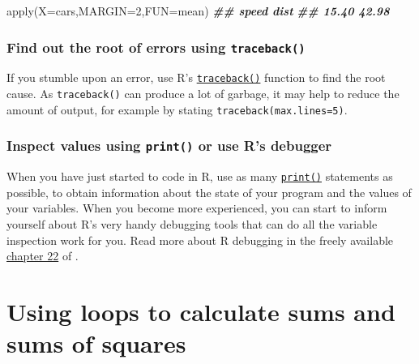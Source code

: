 \documentclass[
]{book}
\newenvironment{Shaded}{\begin{snugshade}}{\end{snugshade}}
\newcommand{\AttributeTok}[1]{\textcolor[rgb]{0.77,0.63,0.00}{#1}}
\newcommand{\DecValTok}[1]{\textcolor[rgb]{0.00,0.00,0.81}{#1}}
\newcommand{\DocumentationTok}[1]{\textcolor[rgb]{0.56,0.35,0.01}{\textbf{\textit{#1}}}}
\newcommand{\FunctionTok}[1]{\textcolor[rgb]{0.00,0.00,0.00}{#1}}
\newcommand{\NormalTok}[1]{#1}
\begin{document}
\begin{Shaded}
\begin{Highlighting}[]
\FunctionTok{apply}\NormalTok{(}\AttributeTok{X=}\NormalTok{cars,}\AttributeTok{MARGIN=}\DecValTok{2}\NormalTok{,}\AttributeTok{FUN=}\NormalTok{mean)}
\DocumentationTok{\#\# speed  dist }
\DocumentationTok{\#\# 15.40 42.98}
\end{Highlighting}
\end{Shaded}

\hypertarget{find-out-the-root-of-errors-using-traceback}{%
\subsection{\texorpdfstring{Find out the root of errors using \texttt{traceback()}}{Find out the root of errors using traceback()}}\label{find-out-the-root-of-errors-using-traceback}}

If you stumble upon an error, use R's \href{https://stat.ethz.ch/R-manual/R-devel/library/base/html/traceback.html}{\texttt{traceback()}} function to find the root cause. As \texttt{traceback()} can produce a lot of garbage, it may help to reduce the amount of output, for example by stating \texttt{traceback(max.lines=5)}.

\hypertarget{inspect-values-using-print-or-use-rs-debugger}{%
\subsection{\texorpdfstring{Inspect values using \texttt{print()} or use R's debugger}{Inspect values using print() or use R's debugger}}\label{inspect-values-using-print-or-use-rs-debugger}}

When you have just started to code in R, use as many \href{https://stat.ethz.ch/R-manual/R-patched/library/base/html/print.html}{\texttt{print()}} statements as possible, to obtain information about the state of your program and the values of your variables. When you become more experienced, you can start to inform yourself about R's very handy debugging tools that can do all the variable inspection work for you. Read more about R debugging in the freely available \href{https://adv-r.hadley.nz/debugging.html}{chapter 22} of \citep{Wickham2019}.

\hypertarget{using-loops-to-calculate-sums-and-sums-of-squares}{%
\chapter{Using loops to calculate sums and sums of squares}\label{using-loops-to-calculate-sums-and-sums-of-squares}}
\end{document}
